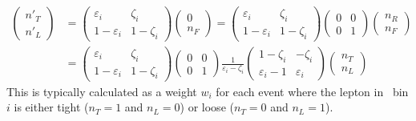 \begin{align*}
  \begin{pmatrix} n'_T \\ n'_L \end{pmatrix} 
  &= 
  \begin{pmatrix}
  \varepsilon_i & \zeta_i \\ 1-\varepsilon_i & 1-\zeta_i
  \end{pmatrix} 
  \begin{pmatrix} 0 \\ n_F \end{pmatrix}
  =  
  \begin{pmatrix}
  \varepsilon_i & \zeta_i \\ 1-\varepsilon_i & 1-\zeta_i
  \end{pmatrix} 
  \begin{pmatrix}0&0\\0&1\end{pmatrix} 
  \begin{pmatrix} n_R \\ n_F \end{pmatrix}\\
  &=
  \begin{pmatrix}
  \varepsilon_i & \zeta_i \\ 1-\varepsilon_i & 1-\zeta_i
  \end{pmatrix} 
  \begin{pmatrix}0&0\\0&1\end{pmatrix} 
  \frac{1}{\varepsilon_i-\zeta_i}
  \begin{pmatrix}
  1-\zeta_i & -\zeta_i \\ \varepsilon_i-1 & \varepsilon_i	
  \end{pmatrix} 
  \begin{pmatrix} n_T \\ n_L \end{pmatrix}
\end{align*}
This is typically calculated as a weight $w_i$ for each event where the lepton in \pt\ bin $i$ is either tight ($n_T=1$ and $n_L=0$) or loose ($n_T=0$ and $n_L=1$).

